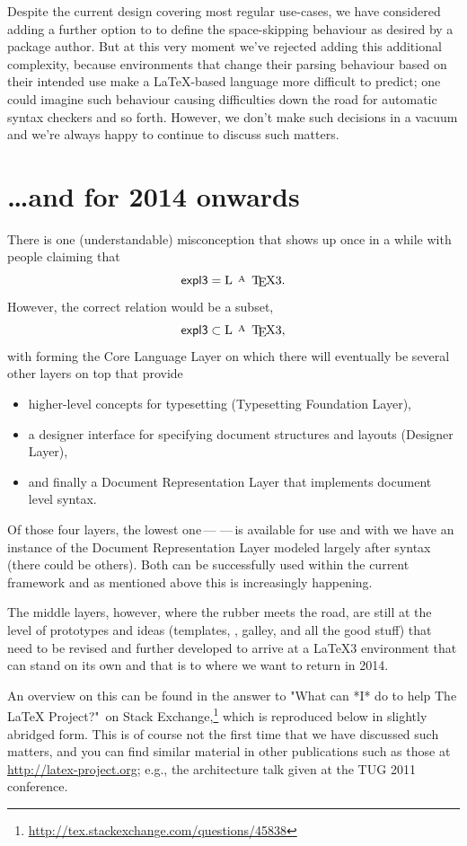 \documentclass{ltnews}
\def\Dash{\,---\,}
\begin{document}
Despite the current design covering most regular use-cases, we have considered adding a further option to  to define the space-skipping behaviour as desired by a package author.
But at this very moment we've rejected adding this additional complexity, because environments that change their parsing behaviour based on their intended use make a \LaTeX-based language more difficult to predict; one could imagine such behaviour causing difficulties down the road for automatic syntax checkers and so forth.
However, we don't make such decisions in a vacuum and we're always happy to continue to discuss such matters.


\section{\ldots and for 2014 onwards}

There is one (understandable) misconception that shows up once in a while with people claiming that
\[
         \textrm{\pkg{expl3}} = \textrm{\LaTeX3}.
\]
However, the correct relation would be a subset,
\[
         \textrm{\pkg{expl3}} \subset \textrm{\LaTeX3},
\]
with  forming the Core Language Layer on which  there will eventually be several other layers on top that \mbox{provide}
\begin{itemize}
\item higher-level concepts for typesetting (Typesetting Foundation Layer),
\item a designer interface for specifying document structures and layouts (Designer Layer),
\item and finally a Document Representation Layer that implements document level syntax.
\end{itemize}
Of those four layers, the lowest one\Dash{}\Dash is available for use and with  we have an instance of the Document Representation Layer modeled largely after \LaTeXe{} syntax (there could be others). Both can be successfully used within the current \LaTeXe{} framework and as mentioned above this is increasingly happening.

The middle layers, however, where the rubber meets the road, are still  at the level of prototypes and ideas (templates, , galley,  and all the good stuff) that need to be revised and further developed to arrive at a \LaTeX3 environment that can stand on its own and that is to where we want to return in 2014.

An overview on this can be found in the answer to "What can *I* do to help The \LaTeX{} Project?"\ on Stack Exchange,\footnote{\url{http://tex.stackexchange.com/questions/45838}}
which is reproduced below in slightly abridged form.
This is of course not the first time that we have discussed such matters, and you can find similar material in other publications such as those at \url{http://latex-project.org}; e.g., the architecture talk given at the TUG 2011 conference.
\end{document}
